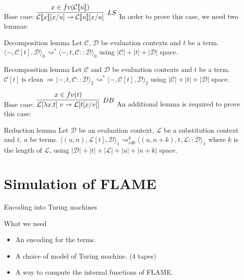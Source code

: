 \documentclass[dvipsnames]{beamer}
\newcommand{\mcl}{\mathcal{L}}
\newcommand{\mcd}{\mathcal{D}}
\newcommand{\mcc}{\mathcal{C}}
\newcommand{\rsa}{\rightsquigarrow}
\newcommand{\etatz}[1]{\langle #1 \rangle_0}
\newcommand{\etatu}[1]{\langle #1 \rangle_1}
\begin{document}
\begin{frame}{Base case: $\infer[LS]{\mathcal{C}\llbracket x \rrbracket [x/u]\rightarrow \mathcal{C}\llbracket u \rrbracket [x/u]}{x \in fv(\mathcal{C}\llbracket u \rrbracket) }$}
  In order to prove this case, we need two lemmas:
  \begin{alertblock}{Decomposition lemma}
 Let $\mcc$, $\mcd$ be evaluation contexts and $t$ be a term.
 $\etatz{-,\mcc[t], \mcd} \rsa^{*} \etatz{-,t,\mcc :: \mcd}$
using $|\mcc|+|t|+|\mcd|$ space.
  \end{alertblock}
   \begin{alertblock}{Recomposition lemma}
  Let $\mathcal{C}$ and $\mathcal{D}$ be evaluation contexts and $t$ be a term.
  $\mathcal{C}[t]~\text{is clean}~\Rightarrow \langle-,t,\mathcal{C}::\mathcal{D}\rangle_2 \rightsquigarrow^{*} \langle-,\mathcal{C}[t],\mathcal{D}\rangle_2$
 using $|\mcc|+|t|+|\mcd|$ space.
  \end{alertblock}
\end{frame}

\begin{frame}{Base case: $\infer[DB]{\mathcal{L}[\lambda x.t]~v \rightarrow \mathcal{L}[t[x/v]]}{x\in fv(t)}$}
  An additional lemma is required to prove this case: 
   \begin{alertblock}{Reduction lemma}
 Let $\mathcal{D}$ be an evaluation context, $\mcl$ be a substitution context and $t$, $u$ be terms.
  $\etatu{(u,n), \mcl[t], \mcd} \rightsquigarrow_{rdb}^k \etatu{(u,n+k), t, \mcl::\mcd}$
  where $k$ is the length of $\mcl$,
  using $|\mcd|+|t|+|\mcl|+|u| + |n+k|$ space.
  \end{alertblock}

\end{frame}

\section{Simulation of FLAME}
\begin{frame}{Encoding into Turing machines}
  \begin{block}{What we need}
    \begin{itemize}
      \item An encoding for the terms.
      \item A choice of model of Turing machine. (4 tapes)
      \item A way to compute the internal functions of FLAME.
    \end{itemize}
  \end{block}
\end{frame}
\end{document}
